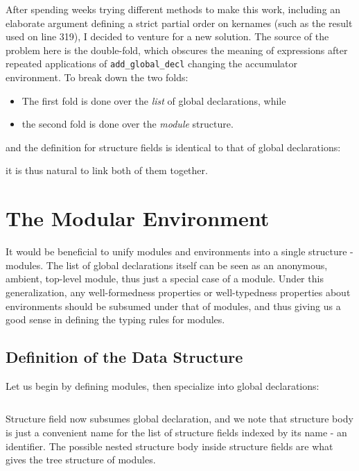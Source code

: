 After spending weeks trying different methods to make this work, including an
elaborate argument defining a strict partial order on kernames (such as the
result used on line 319), I decided to venture for a new solution. The
source of the problem here is the double-fold, which obscures the meaning of
expressions after repeated applications of \verb|add_global_decl| changing the
accumulator environment. To break down the two folds:

\begin{itemize}
  \item The first fold is done over the \emph{list} of global declarations,
  while
  \item the second fold is done over the \emph{module} structure.
\end{itemize}

and the definition for structure fields is identical to that of global
declarations: 


it is thus natural to link both of them together.

\section{The Modular Environment}
\newcommand{\tcc}[3]{\inputminted[firstline={#1},lastline={#2},linenos]{Coq}{
  code/v2/template-coq/theories/#3}}
\newcommand{\pcuicc}[3]{\inputminted[firstline={#1},lastline={#2},linenos]{Coq}{
  code/v2/pcuic/theories/#3}}

It would be beneficial to unify modules and environments into a single structure
- modules. The list of global declarations itself can be seen as an anonymous,
ambient, top-level module, thus just a special case of a module. Under this
generalization, any well-formedness properties or well-typedness properties
about environments should be subsumed under that of modules, and thus giving us
a good sense in defining the typing rules for modules.

\subsection{Definition of the Data Structure}
Let us begin by defining modules, then specialize into global declarations:

\tcc{325}{338}{Environment.v}

Structure field now subsumes global declaration, and we note that structure body
is just a convenient name for the list of structure fields indexed by its name -
an identifier. The possible nested structure body inside structure fields are
what gives the tree structure of modules.

